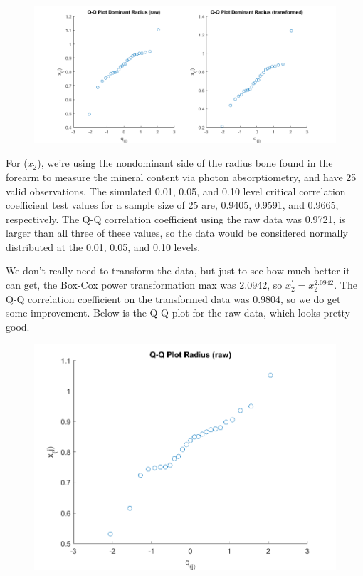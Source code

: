 \begin{center}
    \begin{figure}[H]
        \centering
        \includegraphics[scale=0.4]{./matlab/chapter-4/sol4.34.qq.1.png}
    \end{figure}
\end{center}

For ($x_{2}$), we're using the nondominant side of the radius bone found in the forearm to measure the mineral content via photon absorptiometry, and have 25 valid observations. The simulated 0.01, 0.05, and 0.10 level critical correlation coefficient test values for a sample size of 25 are, 0.9405, 0.9591, and 0.9665, respectively. The Q-Q correlation coefficient using the raw data was 0.9721, is larger than all three of these values, so the data would be considered normally distributed at the 0.01, 0.05, and 0.10 levels.

We don't really need to transform the data, but just to see how much better it can get, the Box-Cox power transformation max was 2.0942, so $x_{2}^{\prime} = x_{2}^{2.0942}$. The Q-Q correlation coefficient on the transformed data was 0.9804, so we do get some improvement. Below is the Q-Q plot for the raw data, which looks pretty good.

\begin{center}
    \begin{figure}[H]
        \centering
        \includegraphics[scale=0.6]{./matlab/chapter-4/sol4.34.qq.2.png}
    \end{figure}
\end{center}

